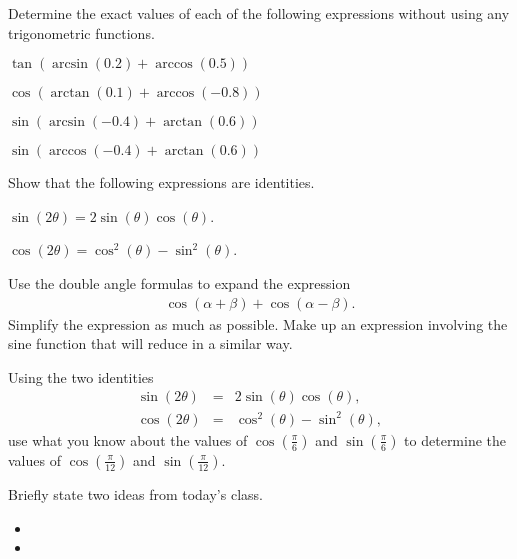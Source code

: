 \begin{problem}
\item Determine the exact values of each of the following expressions
  without using any trigonometric functions.
  \begin{subproblem}
  \item ${\displaystyle \tan(\arcsin(0.2)+\arccos(0.5))}$
    \vfill
  \item ${\displaystyle \cos(\arctan(0.1)+\arccos(-0.8))}$
    \vfill
  \item ${\displaystyle \sin(\arcsin(-0.4)+\arctan(0.6))}$
    \vfill
  \item ${\displaystyle \sin(\arccos(-0.4)+\arctan(0.6))}$
    \vfill
  \end{subproblem}

  \clearpage

\item Show that the following expressions are identities.
  \begin{subproblem}
  \item ${\displaystyle \sin(2\theta)=2\sin(\theta)\cos(\theta)}$.
    \vfill
  \item ${\displaystyle \cos(2\theta)=\cos^2(\theta)-\sin^2(\theta)}$.
    \vfill
  \end{subproblem}

  \clearpage

\item Use the double angle formulas to expand the expression
  \begin{eqnarray*}
    \cos(\alpha+\beta) + \cos(\alpha-\beta).
  \end{eqnarray*}
  Simplify the expression as much as possible.  Make up an expression
  involving the sine function that will reduce in a similar way.

  \vfill

  \clearpage

\item Using the two identities
  \begin{eqnarray*}
    \sin(2\theta) & = & 2\sin(\theta)\cos(\theta), \\
    \cos(2\theta) & = & \cos^2(\theta)-\sin^2(\theta),
  \end{eqnarray*}
  use what you know about the values of $\cos\left(\frac{\pi}{6}\right)$ and
    $\sin\left(\frac{\pi}{6}\right)$ to determine the values of
      $\cos\left(\frac{\pi}{12}\right)$ and $\sin\left(\frac{\pi}{12}\right)$.

  \vfill
  
\end{problem}

\postClass

\begin{problem}
\item Briefly state two ideas from today's class.
  \begin{itemize}
  \item 
  \item 
  \end{itemize}
\item 
  \begin{subproblem}
    \item
  \end{subproblem}
\end{problem}



